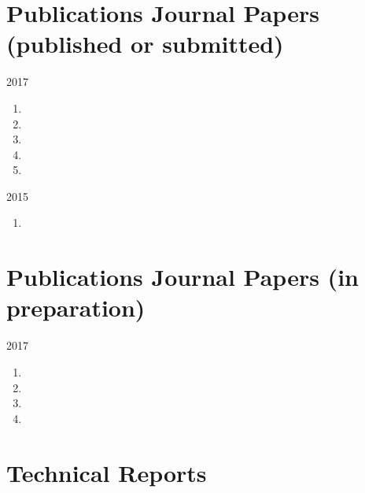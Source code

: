 
\section*{Publications {\small Journal Papers (published or submitted)}}

\begin{paracol}{2}
  \textsc{2017}
\switchcolumn
  \begin{enumerate}
    \item {}
    \item {}
    \item {}
    \item {}
    \item {}
    \setcounter{pubcounter}{\theenumi}
  \end{enumerate}
\end{paracol}

\begin{paracol}{2}
  \textsc{2015}
\switchcolumn
  \begin{enumerate}
    \setcounter{enumi}{\thepubcounter}
    \item {}
    \setcounter{pubcounter}{\theenumi}
  \end{enumerate}
\end{paracol}

\pagebreak %

\section*{Publications {\small Journal Papers (in preparation)}}

\begin{paracol}{2}
  \textsc{2017}
\switchcolumn
    \begin{enumerate}
      \setcounter{enumi}{\thepubcounter}
      \item {}
      \item {}
      \item {}
      \item {}
      \setcounter{pubcounter}{\theenumi}
    \end{enumerate}
\end{paracol}

\section*{Technical Reports}

